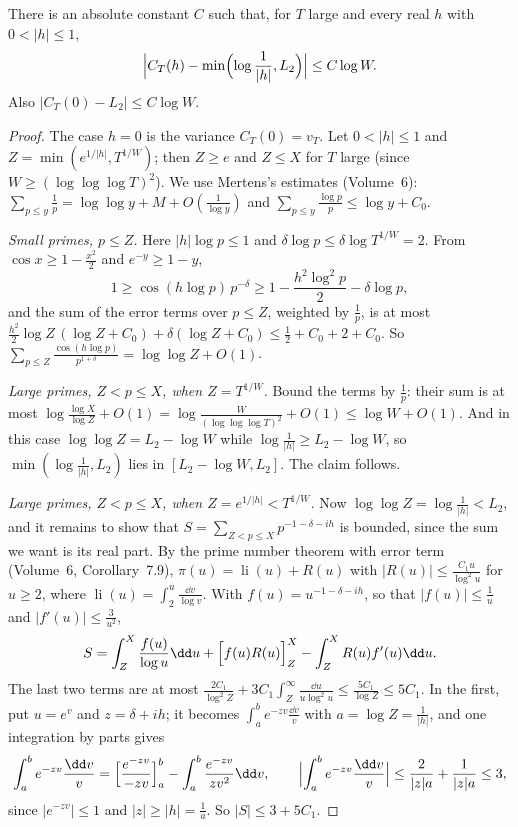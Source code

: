 \begin{lemma}\label{lem:covariance}
There is an absolute constant $C$ such that, for $T$ large and every real $h$ with $0<|h|\le1$,
\[
\Bigl|C_T(h)-\min\Bigl(\log\frac1{|h|},L_2\Bigr)\Bigr|\le C\log W .
\]
Also $|C_T(0)-L_2|\le C\log W$.
\end{lemma}

\begin{proof}
The case $h=0$ is the variance $C_T(0)=v_T$. Let $0<|h|\le1$ and $Z=\min(e^{1/|h|},T^{1/W})$; then $Z\ge e$ and $Z\le X$ for $T$ large (since $W\ge(\log\log\log T)^2$). We use Mertens's estimates (Volume~6): $\sum_{p\le y}\frac1p=\log\log y+M+O(\frac1{\log y})$ and $\sum_{p\le y}\frac{\log p}p\le\log y+C_0$.

\emph{Small primes, $p\le Z$.} Here $|h|\log p\le1$ and $\delta\log p\le\delta\log T^{1/W}=2$. From $\cos x\ge1-\frac{x^2}2$ and $e^{-y}\ge1-y$,
\[
1\ge\cos(h\log p)\,p^{-\delta}\ge1-\frac{h^2\log^2p}2-\delta\log p,
\]
and the sum of the error terms over $p\le Z$, weighted by $\frac1p$, is at most $\frac{h^2}2\log Z\,(\log Z+C_0)+\delta(\log Z+C_0)\le\frac12+C_0+2+C_0$. So $\sum_{p\le Z}\frac{\cos(h\log p)}{p^{1+\delta}}=\log\log Z+O(1)$.

\emph{Large primes, $Z<p\le X$, when $Z=T^{1/W}$.} Bound the terms by $\frac1p$: their sum is at most $\log\frac{\log X}{\log Z}+O(1)=\log\frac W{(\log\log\log T)^2}+O(1)\le\log W+O(1)$. And in this case $\log\log Z=L_2-\log W$ while $\log\frac1{|h|}\ge L_2-\log W$, so $\min(\log\frac1{|h|},L_2)$ lies in $[L_2-\log W,L_2]$. The claim follows.

\emph{Large primes, $Z<p\le X$, when $Z=e^{1/|h|}<T^{1/W}$.} Now $\log\log Z=\log\frac1{|h|}<L_2$, and it remains to show that $S=\sum_{Z<p\le X}p^{-1-\delta-ih}$ is bounded, since the sum we want is its real part. By the prime number theorem with error term (Volume~6, Corollary~7.9), $\pi(u)=\operatorname{li}(u)+R(u)$ with $|R(u)|\le\frac{C_1u}{\log^2u}$ for $u\ge2$, where $\operatorname{li}(u)=\int_2^u\frac{\dd v}{\log v}$. With $f(u)=u^{-1-\delta-ih}$, so that $|f(u)|\le\frac1u$ and $|f'(u)|\le\frac3{u^2}$,
\[
S=\int_Z^X\frac{f(u)}{\log u}\dd u+\Bigl[f(u)R(u)\Bigr]_Z^X-\int_Z^XR(u)f'(u)\dd u .
\]
The last two terms are at most $\frac{2C_1}{\log^2Z}+3C_1\int_Z^\infty\frac{\dd u}{u\log^2u}\le\frac{5C_1}{\log Z}\le5C_1$. In the first, put $u=e^v$ and $z=\delta+ih$; it becomes $\int_a^be^{-zv}\frac{\dd v}v$ with $a=\log Z=\frac1{|h|}$, and one integration by parts gives
\[
\int_a^be^{-zv}\frac{\dd v}v=\Bigl[\frac{e^{-zv}}{-zv}\Bigr]_a^b-\int_a^b\frac{e^{-zv}}{zv^2}\dd v,\qquad\Bigl|\int_a^be^{-zv}\frac{\dd v}v\Bigr|\le\frac2{|z|a}+\frac1{|z|a}\le3,
\]
since $|e^{-zv}|\le1$ and $|z|\ge|h|=\frac1a$. So $|S|\le3+5C_1$.
\end{proof}

